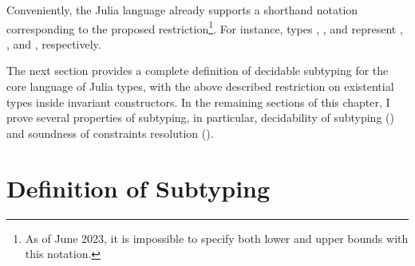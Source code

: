 Conveniently, the Julia language already supports a shorthand notation
corresponding to the proposed restriction\footnote{As of June 2023,
it is impossible to specify both lower and upper bounds with this notation.}.
For instance, types , , and 
represent , ,
and , respectively.

The next section provides a complete definition of decidable subtyping
for the core language of Julia types, with the above described restriction
on existential types inside invariant constructors.
In the remaining sections of this chapter, I prove several properties
of subtyping, in particular,
decidability of subtyping ()
and
soundness of constraints resolution ().

\section{Definition of Subtyping}%
\label{sec:dec-sub:defs}


